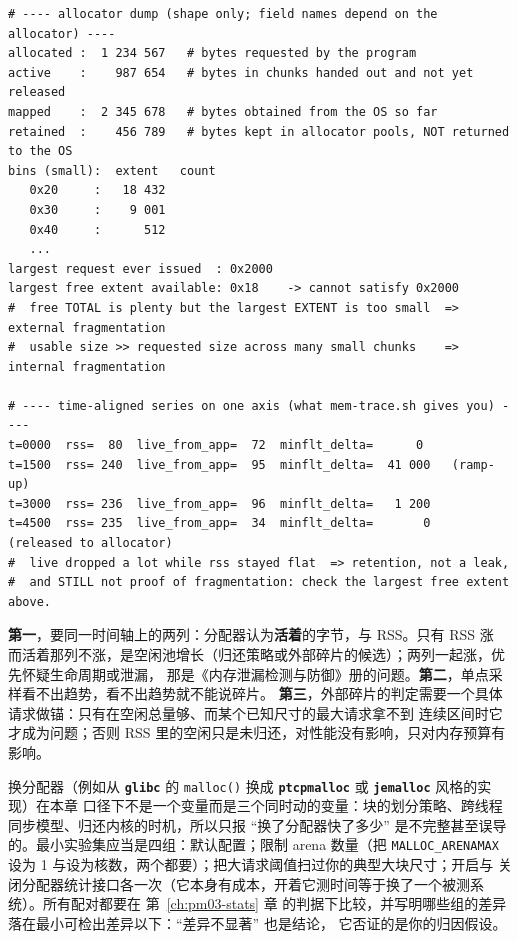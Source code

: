 \documentclass[12pt,a4paper,fontset=fandol]{ctexbook}
\newcommand{\Fn}[1]{\texttt{#1()}}
\newcommand{\Tp}[1]{\texttt{#1}}
\newcommand{\Bk}{\discretionary{}{}{}}
\newcommand{\Lib}[1]{\textbf{\texttt{#1}}}
\newcommand{\Mx}[1]{\textsf{#1}}
\begin{document}
\begin{lstlisting}[style=outstyle, caption={分配器统计与时序对齐的输出口态示意（格式示例，非本仓库实测值；下面每一个数字都是占位符，不可引用）}, label={lst:pm07-fragfmt}]
# ---- allocator dump (shape only; field names depend on the allocator) ----
allocated :  1 234 567   # bytes requested by the program
active    :    987 654   # bytes in chunks handed out and not yet released
mapped    :  2 345 678   # bytes obtained from the OS so far
retained  :    456 789   # bytes kept in allocator pools, NOT returned to the OS
bins (small):  extent   count
   0x20     :   18 432
   0x30     :    9 001
   0x40     :      512
   ...
largest request ever issued  : 0x2000
largest free extent available: 0x18    -> cannot satisfy 0x2000
#  free TOTAL is plenty but the largest EXTENT is too small  => external fragmentation
#  usable size >> requested size across many small chunks    => internal fragmentation

# ---- time-aligned series on one axis (what mem-trace.sh gives you) ----
t=0000  rss=  80  live_from_app=  72  minflt_delta=      0
t=1500  rss= 240  live_from_app=  95  minflt_delta=  41 000   (ramp-up)
t=3000  rss= 236  live_from_app=  96  minflt_delta=   1 200
t=4500  rss= 235  live_from_app=  34  minflt_delta=       0   (released to allocator)
#  live dropped a lot while rss stayed flat  => retention, not a leak,
#  and STILL not proof of fragmentation: check the largest free extent above.
\end{lstlisting}

\begin{warning}[title={不能从一张 \Mx{RSS} 曲线得出碎片结论}]
  \textbf{第一}，要同一时间轴上的两列：分配器认为\textbf{活着}的字节，与 \Mx{RSS}。只有 \Mx{RSS} 涨
  而活着那列不涨，是空闲池增长（归还策略或外部碎片的候选）；两列一起涨，优先怀疑生命周期或泄漏，
  那是《内存泄漏检测与防御》册的问题。\textbf{第二}，单点采样看不出趋势，看不出趋势就不能说碎片。
  \textbf{第三}，外部碎片的判定需要一个具体请求做锚：只有在空闲总量够、而某个已知尺寸的最大请求拿不到
  连续区间时它才成为问题；否则 \Mx{RSS} 里的空闲只是未归还，对性能没有影响，只对内存预算有影响。
\end{warning}

换分配器（例如从 \Lib{glibc} 的 \Fn{malloc} 换成 \Lib{ptcpmalloc} 或 \Lib{jemalloc} 风格的实现）在本章
口径下不是一个变量而是三个同时动的变量：块的划分策略、跨线程同步模型、归还内核的时机，所以只报
``换了分配器快了多少'' 是不完整甚至误导的。最小实验集应当是四组：默认配置；限制 arena 数量（把
\Tp{MALLOC\_ARENA{\Bk}MAX} 设为 1 与设为核数，两个都要）；把大请求阈值扫过你的典型大块尺寸；开启与
关闭分配器统计接口各一次（它本身有成本，开着它测时间等于换了一个被测系统）。所有配对都要在
第~\ref{ch:pm03-stats} 章 的判据下比较，并写明哪些组的差异落在最小可检出差异以下：``差异不显著'' 也是结论，
它否证的是你的归因假设。
\end{document}
